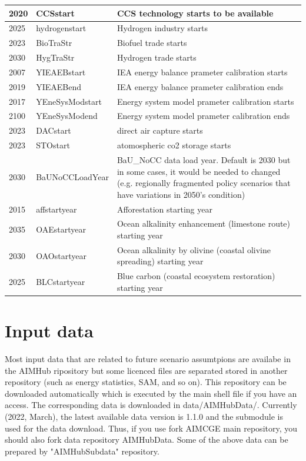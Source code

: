\documentclass[10pt,a4paper,titlepage,dvipdfmx]{book}
\begin{document}
\begin{tabularx}{\textwidth}{|
p{}|
p{}|
p{}|}
2020 & CCSstart & CCS technology starts to be available \\\hline 
2025 & hydrogenstart & Hydrogen industry starts \\\hline 
2023 & BioTraStr & Biofuel trade starts \\\hline 
2030 & HygTraStr & Hydrogen trade starts \\\hline 
2007 & YIEAEBstart & IEA energy balance prameter calibration starts \\\hline 
2019 & YIEAEBend & IEA energy balance prameter calibration ends \\\hline 
2017 & YEneSysModstart & Energy system model prameter calibration starts \\\hline 
2100 & YEneSysModend & Energy system model prameter calibration ends \\\hline 
2023 & DACstart & direct air capture starts \\\hline 
2023 & STOstart & atomospheric co2 storage starts \\\hline 
2030 & BaUNoCCLoadYear & BaU\_NoCC data load year. Default is 2030 but in some cases, it would be needed to changed (e.g. regionally fragmented policy scenarios that have variations in 2050's condition) \\\hline 
2015 & affstartyear & Afforestation starting year \\\hline
2035 & OAEstartyear & Ocean alkalinity enhancement (limestone route) starting year \\\hline
2030 & OAOstartyear & Ocean alkalinity by olivine (coastal olivine spreading) starting year \\\hline
2025 & BLCstartyear & Blue carbon (coastal ecosystem restoration) starting year \\\hline
\end{tabularx}

\section{\label{sec:InpData}Input data}
Most input data that are related to future scenario assumtpions are availabe in the AIMHub ripository but some licenced files are separated stored in another repository (such as energy statistics, SAM, and so on).
This repository can be downloaded automatically which is executed by the main shell file if you have an access.
The corresponding data is downloaded in data/AIMHubData/. Currently (2022, March), the latest available data version is 1.1.0 and the submodule is used for the data download. Thus, if you use fork AIMCGE main repository, you should also fork data repository AIMHubData.
Some of the above data can be prepared by "AIMHubSubdata" repository.
\end{document}
